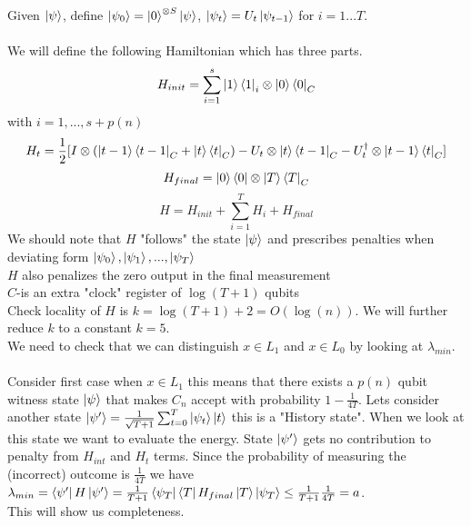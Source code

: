 \documentclass{article}
\begin{document}
                       Given $\ket{\psi}$, define $\ket{\psi_0} = \ket{0}^{\otimes S}\ket{\psi}$, $\ket{\psi_t} = U_t \ket{\psi_{t-1}}$ for $i = 1...T$. \\\\
                       We will define the following Hamiltonian which has three parts. $$H_{init} = \sum_{i=1}^s \ket{1} \bra{1}_i \otimes \ket{0} \bra{0}_C$$
                       with $i = 1, ..., s+p(n)$
                       $$
                       H_t = \frac{1}{2} [ I \otimes ( \ket{t-1} \bra{t-1}_C + \ket{t}\bra{t}_C) - U_t \otimes \ket{t} \bra{t-1}_C - U_t^{\dagger} \otimes \ket{t-1} \bra{t}_C]
                       $$
                       $$
                       H_{final} = \ket{0} \bra{0} \otimes \ket{T} \bra{T}_C
                       $$
                       $$H= H_{init} + \sum_{i=1}^T H_i + H_{final}$$
                       We should note that $H$ "follows" the state $\ket{\psi}$ and prescribes penalties when deviating form $\ket{\psi_0}, \ket{\psi_1},..., \ket{\psi_T}$\\
                       $H$ also penalizes the zero output in the final measurement\\
                       $C$-is an extra "clock" register of $\log (T+1)$ qubits\\
                       Check locality of $H$ is $k= \log (T+1) + 2 = O(\log (n))$. We will further reduce $k$ to a constant $k = 5$.\\
                       We need to check that we can distinguish $x\in L_1$ and $x \in L_0$ by looking at $\lambda_{min}$. \\\\
                       Consider first case when $x \in L_1$ this means that there exists a $p(n)$ qubit witness state $\ket{\psi}$ that makes $C_n$ accept with probability $1- \frac{1}{4T}$. Lets consider another state $\ket{\psi'} = \frac{1}{\sqrt{T+1}} \sum_{t = 0}^T \ket{\psi_t} \ket{t}$ this is a "History state". When we look at this state we want to evaluate the energy.
                       State $\ket{\psi'}$ gets no contribution to penalty from $H_{int}$ and $H_t$ terms. Since the probability of measuring the (incorrect) outcome is $\frac{1}{4T}$ we have $\lambda_{min} = \bra{\psi'} H \ket{\psi'} = \frac{1}{T+1} \bra{\psi_T} \bra{T} H_{final} \ket{T} \ket{\psi_T} \leq \frac{1}{T+1} \frac{1}{4T} = a$.\\
                       This will show us completeness.\\\\
\end{document}

